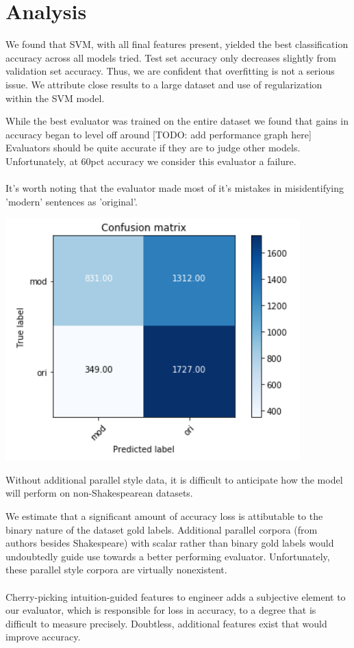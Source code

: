 \documentclass[letterpaper, 10 pt, conference]{ieeeconf}  %
\begin{document}
  \section{Analysis}
  We found that SVM, with all final features present, yielded the best classification accuracy across all models tried. Test set accuracy only decreases slightly from validation set accuracy. Thus, we are confident that overfitting is not a serious issue. We attribute close results to a large dataset and use of regularization within the SVM model.

  While the best evaluator was trained on the entire dataset we found that gains in accuracy began to level off around [TODO: add performance graph here]
  \\
  Evaluators should be quite accurate if they are to judge other models. Unfortunately, at 60pct accuracy we consider this evaluator a failure. \\
  \\
  It's worth noting that the evaluator made most of it's mistakes in misidentifying 'modern' sentences as 'original'.

  \includegraphics[scale=.5]{confmat.png}

  Without additional parallel style data, it is difficult to anticipate how the model will perform on non-Shakespearean datasets.

  We estimate that a significant amount of accuracy loss is attibutable to the binary nature of the dataset gold labels. Additional parallel corpora (from authors besides Shakespeare) with scalar rather than binary gold labels would undoubtedly guide use towards a better performing evaluator. Unfortunately, these parallel style corpora are virtually nonexistent.
  \\
  \\
  Cherry-picking intuition-guided features to engineer adds a subjective element to our evaluator, which is responsible for loss in accuracy, to a degree that is difficult to measure precisely. Doubtless, additional features exist that would improve accuracy.
\end{document}
